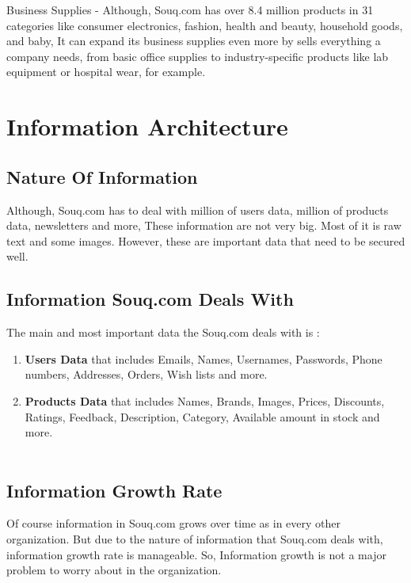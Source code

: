 \documentclass{book}
\begin{document}
\noindent Business Supplies - Although, Souq.com has over 8.4 million products in 31 categories like consumer electronics, fashion, health and beauty, household goods, and baby, It can expand its business supplies even more by sells everything a company needs, from basic office supplies to industry-specific products like lab equipment or hospital wear, for example.\\

\chapter{Information Architecture}

\section{Nature Of Information}
Although, Souq.com has to deal with million of users data, million of products data, newsletters and more, These information are not very big. Most of it is raw text and some images. However, these are important data that need to be secured well.\\

\section{Information Souq.com Deals With}
The main and most important data the Souq.com deals with is :\\
\begin{enumerate}
\item \textbf{Users Data} that includes Emails, Names, Usernames, Passwords, Phone numbers, Addresses, Orders, Wish lists and more.
\item \textbf{Products Data} that includes Names, Brands, Images, Prices, Discounts, Ratings, Feedback, Description, Category, Available amount in stock and more.\\\\
\end{enumerate}


\section{Information Growth Rate}
Of course information in Souq.com grows over time as in every other organization. But due to the nature of information that Souq.com deals with, information growth rate is manageable. So, Information growth is not a major problem to worry about in the organization.\\
\end{document}
